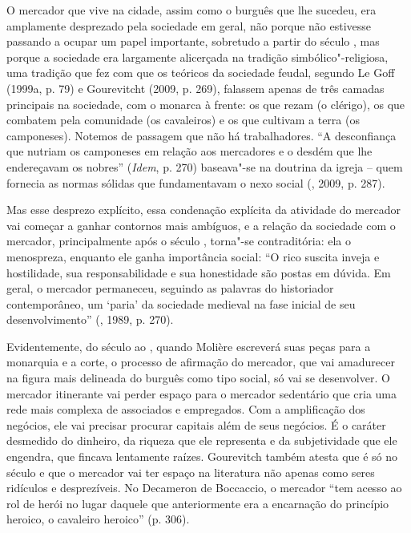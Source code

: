O mercador que vive na cidade, assim como o burguês que lhe sucedeu, era
amplamente desprezado pela sociedade em geral, não porque não estivesse
passando a ocupar um papel importante, sobretudo a partir do século
, mas porque a sociedade era largamente alicerçada na tradição
simbólico"-religiosa, uma tradição que fez com que os teóricos da
sociedade feudal, segundo Le Goff (1999a, p. 79) e Gourevitcht (2009, p.
269), falassem apenas de três camadas principais na sociedade, com o
monarca à frente: os que rezam (o clérigo), os que combatem pela
comunidade (os cavaleiros) e os que cultivam a terra (os camponeses).
Notemos de passagem que não há trabalhadores. ``A desconfiança que
nutriam os camponeses em relação aos mercadores e o desdém que lhe
endereçavam os nobres'' (\emph{Idem}, p. 270) baseava"-se
na doutrina da igreja -- quem fornecia as normas sólidas que
fundamentavam o nexo social (, 2009, p. 287).

Mas esse desprezo explícito, essa condenação explícita da atividade do
mercador vai começar a ganhar contornos mais ambíguos, e a relação da
sociedade com o mercador, principalmente após o século , torna"-se
contraditória: ela o menospreza, enquanto ele ganha importância social:
``O rico suscita inveja e hostilidade, sua responsabilidade e sua
honestidade são postas em dúvida. Em geral, o mercador permaneceu,
seguindo as palavras do historiador contemporâneo, um `paria' da
sociedade medieval na fase inicial de seu desenvolvimento'' (,
1989, p. 270).

Evidentemente, do século  ao , quando Molière escreverá suas
peças para a monarquia e a corte, o processo de afirmação do mercador,
que vai amadurecer na figura mais delineada do burguês como tipo social,
só vai se desenvolver. O mercador itinerante vai perder espaço para o
mercador sedentário que cria uma rede mais complexa de associados e
empregados. Com a amplificação dos negócios, ele vai precisar procurar
capitais além de seus negócios. É
o caráter desmedido do dinheiro, da riqueza que ele representa e da
subjetividade que ele engendra, que fincava lentamente raízes.
Gourevitch também atesta que é só no século  e  que o
mercador vai ter espaço na literatura não apenas como seres ridículos e
desprezíveis. No Decameron de Boccaccio, o mercador ``tem acesso ao rol
de herói no lugar daquele que anteriormente era a encarnação do
princípio heroico, o cavaleiro heroico'' (p. 306).

